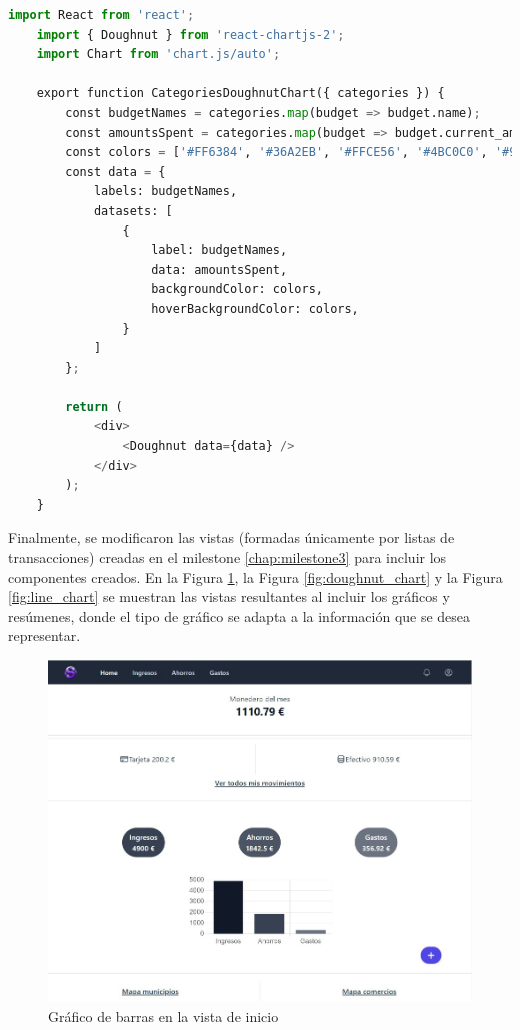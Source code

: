 \begin{lstlisting}[language=Python, caption=Componente de React para el gráfico de tipo donut]
    import React from 'react';
    import { Doughnut } from 'react-chartjs-2';
    import Chart from 'chart.js/auto';
    
    export function CategoriesDoughnutChart({ categories }) {
        const budgetNames = categories.map(budget => budget.name);
        const amountsSpent = categories.map(budget => budget.current_amount_spent);
        const colors = ['#FF6384', '#36A2EB', '#FFCE56', '#4BC0C0', '#9966FF', '#FF9F40'];
        const data = {
            labels: budgetNames,
            datasets: [
                {
                    label: budgetNames,
                    data: amountsSpent,
                    backgroundColor: colors,
                    hoverBackgroundColor: colors,
                }
            ]
        };
    
        return (
            <div>
                <Doughnut data={data} />
            </div>
        );
    }    
\end{lstlisting}


Finalmente, se modificaron las vistas (formadas únicamente por listas de transacciones) creadas en el milestone \ref{chap:milestone3} para incluir los componentes creados. En la Figura \ref{fig:bar_chart}, la Figura \ref{fig:doughnut_chart} y la Figura \ref{fig:line_chart} se muestran las vistas resultantes al incluir los gráficos y resúmenes, donde el tipo de gráfico se adapta a la información que se desea representar.

\begin{figure}[ht!]
    \centering
    \includegraphics[width=\linewidth]{imagenes/M3-home.jpg}
    \caption{Gráfico de barras en la vista de inicio}
    \label{fig:bar_chart}
\end{figure}

